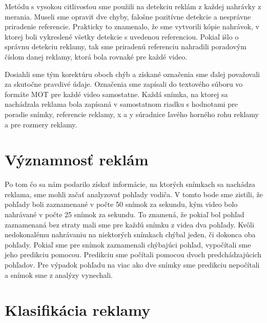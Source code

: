 Metódu s vysokou citlivosťou sme použili na detekciu reklám z každej nahrávky z merania. Museli sme opraviť dve chyby, falošne pozitívne detekcie a nesprávne priradenie referencie. Prakticky to znamenalo, že sme vytvorili kópie nahrávok, v ktorej boli vykreslené všetky detekcie s uvedenou referenciou. Pokiaľ išlo o správnu detekciu reklamy, tak sme priradenú referenciu nahradili poradovým číslom danej reklamy, ktorá bola rovnaké pre každé video. 

Dosiahli sme tým korektúru oboch chýb a získané označenia sme ďalej považovali za skutočne pravdivé údaje. Označenia sme zapísali do textového súboru vo formáte MOT pre každé video samostatne. Každá snímka, na ktorej sa nachádzala reklama bola zapísaná v samostatnom riadku s hodnotami pre poradie snímky, referencie reklamy, x a y súradnice ľavého horného rohu reklamy a pre rozmery reklamy.

\section{Významnosť reklám}

Po tom čo sa nám podarilo získať informácie, na ktorých snímkach sa nachádza reklama, sme mohli začať analyzovať pohľady vodiča. V tomto bode sme zistili, že pohľady boli zaznamenané v počte 50 snímok za sekundu, kým video bolo nahrávané v počte 25 snímok za sekundu. To znamená, že pokiaľ bol pohľad zaznamenaná bez straty mali sme pre každú snímku z videa dva pohľady. Kvôli nedokonalému nahrávaniu na niektorých snímkach chýbal jeden, či dokonca oba pohľady. Pokiaľ sme pre snímok zaznamenali chýbajúci pohľad, vypočítali sme jeho predikciu pomocou. Predikciu sme počítali pomocou dvoch predchádzajúcich pohľadov. Pre výpadok pohľadu na viac ako dve snímky sme predikciu nepočítali a snímok sme z analýzy vynechali.

\section{Klasifikácia reklamy}


